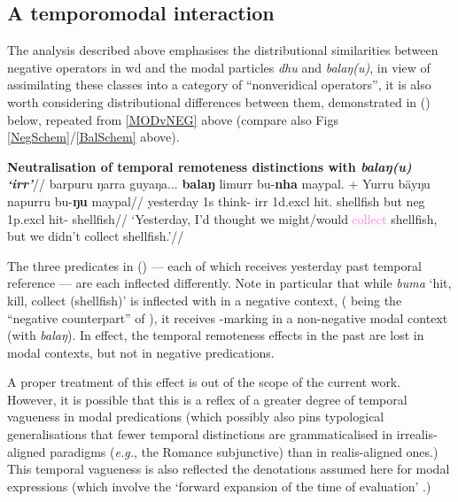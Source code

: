 \subsection{A temporomodal interaction}

The analysis described above emphasises the distributional similarities between negative operators in \gls{wd} and the modal particles \textit{dhu} and \textit{balaŋ(u)}, in view of assimilating these classes into a category of ``nonveridical operators'', it is also worth considering distributional differences between them, demonstrated in (\nextx) below, repeated from \ref{MODvNEG} above (compare also Figs \ref{NegSchem}/\ref{BalSchem} above).

\pex\begingl\glpreamble\textbf{ Neutralisation of temporal remoteness distinctions with \textit{balaŋ(u) `\gls{irr}'}}//
\gla barpuru ŋarra guyaŋa... \textbf{balaŋ} limurr bu-\textbf{nha} maypal. + Yurru bäyŋu napurru bu-\textbf{ŋu} maypal//
\glb yesterday 1s think-\I{} \gls{irr} 1d.\gls{excl} hit.\IV{} shellfish but \gls{neg} 1p.\gls{excl} hit-\II{} shellfish//
\glft`Yesterday, I'd \textcolor{forest}{thought} we might/would \textcolor{violet}{collect} shellfish, but we didn't \textcolor{ochre}{collect} shellfish.'\trailingcitation{[AW~20190429]}//\endgl
\xe


The three predicates in (\lastx) --- each of which receives yesterday past temporal reference --- are each inflected differently. Note in particular that while \textit{buma} `hit, kill, collect (shellfish)' is inflected with \II{}  in a negative context, (\II{} being the ``negative counterpart'' of \I{}), it receives \IV{}-marking in a non-negative modal context (with \textit{balaŋ}). In effect, the temporal remoteness effects in the past are lost in modal contexts, but not in negative predications.

A proper treatment of this effect is out of the scope of the current work. However, it is possible that this is a reflex of a greater degree of temporal vagueness in modal predications (which possibly also pins typological generalisations that fewer temporal distinctions are grammaticalised in irrealis-aligned paradigms (\textit{e.g.}, the Romance subjunctive) than in realis-aligned ones.) This temporal vagueness is also reflected the denotations assumed here for modal expressions (which involve the `forward expansion of the time of evaluation' \citet[12]{Condoravdi2003}.)



